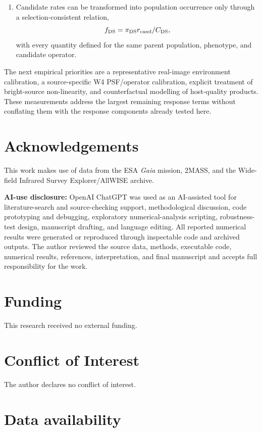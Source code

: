 \documentclass[fleqn,usenatbib]{mnras}
\begin{document}
\begin{enumerate}
\item Candidate rates can be transformed into population occurrence only through a selection-consistent relation,
\begin{equation}
f_{\rm DS}=\pi_{\rm DS}r_{\rm cand}/C_{\rm DS},
\end{equation}
with every quantity defined for the same parent population, phenotype, and candidate operator.
\end{enumerate}

The next empirical priorities are a representative real-image environment calibration, a source-specific W4 PSF/operator calibration, explicit treatment of bright-source non-linearity, and counterfactual modelling of host-quality products. These measurements address the largest remaining response terms without conflating them with the response components already tested here.

\section*{Acknowledgements}

This work makes use of data from the ESA \textit{Gaia} mission, 2MASS, and the Wide-field Infrared Survey Explorer/AllWISE archive.

\textbf{AI-use disclosure:} OpenAI ChatGPT was used as an AI-assisted tool for literature-search and source-checking support, methodological discussion, code prototyping and debugging, exploratory numerical-analysis scripting, robustness-test design, manuscript drafting, and language editing. All reported numerical results were generated or reproduced through inspectable code and archived outputs. The author reviewed the source data, methods, executable code, numerical results, references, interpretation, and final manuscript and accepts full responsibility for the work.

\section*{Funding}

This research received no external funding.

\section*{Conflict of Interest}

The author declares no conflict of interest.

\section*{Data availability}
\end{document}
